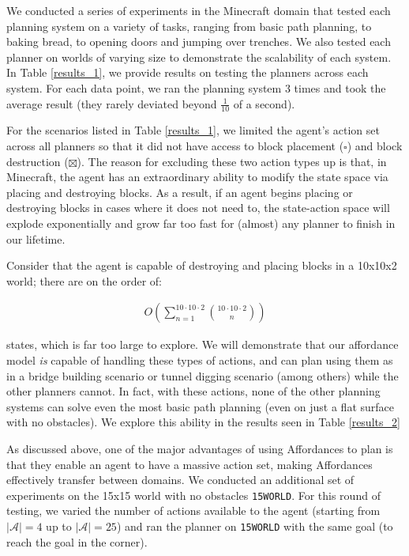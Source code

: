 \documentclass[]{article}
\begin{document}
We conducted a series of experiments in the Minecraft domain that
tested each planning system on a variety of tasks, ranging from basic
path planning, to baking bread, to opening doors and jumping over
trenches.  We also tested each planner on worlds of varying size to
demonstrate the scalability of each system. In Table \ref{results_1},
we provide results on testing the planners across each system. For
each data point, we ran the planning system 3 times and took the
average result (they rarely deviated beyond $\frac{1}{10}$ of a
second).

For the scenarios listed in Table \ref{results_1}, we limited the agent's 
action set across all planners so that it did not have access to block 
placement ($\square$) and block destruction ($\boxtimes$). The reason 
for excluding these two action types up is that, in Minecraft, the agent 
has an extraordinary ability to modify the state space via placing and 
destroying blocks. As a result, if an agent begins placing or destroying 
blocks in cases where it does not need to, the state-action space will 
explode exponentially and grow far too fast for (almost) any planner to 
finish in our lifetime. 

Consider that the agent is capable of destroying and placing blocks 
in a 10x10x2 world; there are on the order of:

\begin{align}
O\left(\sum_{n=1}^{10 \cdot 10 \cdot 2} \binom{10 \cdot 10 \cdot 2}{n}\right)
\label{eq:mc_explode}
\end{align}

states, which is far too large to explore. We will demonstrate that our 
affordance model {\it is} capable of handling these types of actions, 
and can plan using them as in a bridge building scenario or tunnel 
digging scenario (among others) while the other planners cannot. 
In fact, with these actions, none of the other planning systems 
can solve even the most basic path planning (even on just a flat 
surface with no obstacles). We explore this ability in the results 
seen in Table \ref{results_2}

As discussed above, one of the major advantages of using Affordances 
to plan is that they enable an agent to have a massive action set, 
making Affordances effectively transfer between domains. We 
conducted an additional set of experiments on the 15x15 world 
with no obstacles \texttt{15WORLD}. For this round of testing, we 
varied the number of actions available to the agent (starting from 
$|\mathcal{A}| = 4$ up to $|\mathcal{A}| = 25$) and ran the planner 
on \texttt{15WORLD} with the same goal (to reach the goal in the corner).
\end{document}
